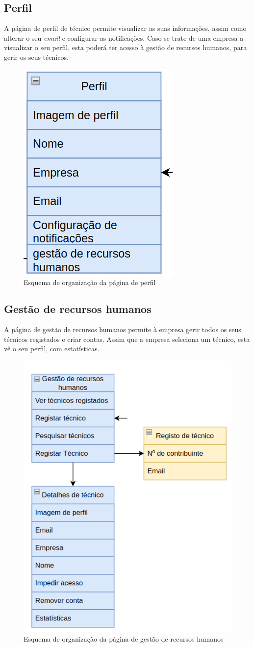 \subsection{Perfil}

A página de perfil de técnico permite visualizar as suas informações, assim como alterar 
o seu \textit{email} e configurar as notificações. Caso se trate de uma empresa a visualizar o seu perfil, esta poderá ter acesso à gestão de recursos humanos, para gerir os seus técnicos.
\begin{figure}[htb]
  \centering
  
  \includegraphics[height=0.35\textwidth]{images/Arquiteturas/superficial_de_app/perfil.png}
  \caption{Esquema de organização da página de perfil}
  \label{fig:10}
\end{figure}

\newpage

\subsection{Gestão de recursos humanos}

A página de gestão de recursos humanos permite à empresa gerir todos os seus técnicos registados e criar contas. Assim que a empresa seleciona um técnico, esta vê o seu perfil, 
com estatísticas.
\begin{figure}[htb]
  \centering
  
  \includegraphics[height=0.7\textwidth]{images/Arquiteturas/superficial_de_app/gestao_recursos_humanos.png}
  \caption{Esquema de organização da página de gestão de recursos humanos}
  \label{fig:11}
\end{figure}